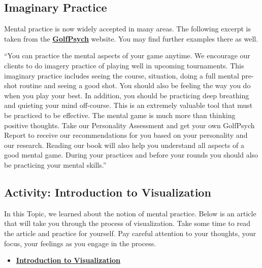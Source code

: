 \documentclass[
]{book}
\providecommand{\tightlist}{%
  \setlength{\itemsep}{0pt}\setlength{\parskip}{0pt}}
\begin{document}
\hypertarget{imaginary-practice}{%
\subsection*{Imaginary Practice}\label{imaginary-practice}}

Mental practice is now widely accepted in many areas. The following excerpt is taken from the \href{https://www.golfpsych.com}{\textbf{GolfPsych}} website. You may find further examples there as well.

``You can practice the mental aspects of your game anytime. We encourage our clients to do imagery practice of playing well in upcoming tournaments. This imaginary practice includes seeing the course, situation, doing a full mental pre-shot routine and seeing a good shot. You should also be feeling the way you do when you play your best. In addition, you should be practicing deep breathing and quieting your mind off-course. This is an extremely valuable tool that must be practiced to be effective. The mental game is much more than thinking positive thoughts. Take our Personality Assessment and get your own GolfPsych Report to receive our recommendations for you based on your personality and our research. Reading our book will also help you understand all aspects of a good mental game. During your practices and before your rounds you should also be practicing your mental skills.''

\hypertarget{activity-introduction-to-visualization}{%
\subsection*{Activity: Introduction to Visualization}\label{activity-introduction-to-visualization}}

\begin{reflect}
In this Topic, we learned about the notion of mental practice. Below is an article that will take you through the process of visualization. Take some time to read the article and practice for yourself. Pay careful attention to your thoughts, your focus, your feelings as you engage in the process.

\begin{itemize}
\tightlist
\item
  \href{https://www.forbes.com/sites/bhaligill/2017/06/22/new-to-visualization-here-are-5-steps-to-get-you-started/\#60dafcdc6e3f}{\textbf{Introduction to Visualization}}
\end{itemize}
\end{reflect}
\end{document}
